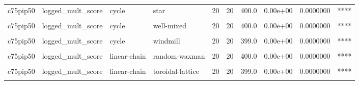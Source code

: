\documentclass[
]{book}
\begin{document}
\begin{table}
\begin{tabular}{l|l|l|l|r|r|r|r|r|l}
\hline
\cellcolor{gray!6}{c75pip50} & \cellcolor{gray!6}{logged\_mult\_score} & \cellcolor{gray!6}{cycle} & \cellcolor{gray!6}{random-waxman} & \cellcolor{gray!6}{20} & \cellcolor{gray!6}{20} & \cellcolor{gray!6}{400.0} & \cellcolor{gray!6}{0.00e+00} & \cellcolor{gray!6}{0.0000000} & \cellcolor{gray!6}{****}\\
\hline
c75pip50 & logged\_mult\_score & cycle & star & 20 & 20 & 400.0 & 0.00e+00 & 0.0000000 & ****\\
\hline
\cellcolor{gray!6}{c75pip50} & \cellcolor{gray!6}{logged\_mult\_score} & \cellcolor{gray!6}{cycle} & \cellcolor{gray!6}{toroidal-lattice} & \cellcolor{gray!6}{20} & \cellcolor{gray!6}{20} & \cellcolor{gray!6}{399.0} & \cellcolor{gray!6}{0.00e+00} & \cellcolor{gray!6}{0.0000000} & \cellcolor{gray!6}{****}\\
\hline
c75pip50 & logged\_mult\_score & cycle & well-mixed & 20 & 20 & 400.0 & 0.00e+00 & 0.0000000 & ****\\
\hline
\cellcolor{gray!6}{c75pip50} & \cellcolor{gray!6}{logged\_mult\_score} & \cellcolor{gray!6}{cycle} & \cellcolor{gray!6}{wheel} & \cellcolor{gray!6}{20} & \cellcolor{gray!6}{20} & \cellcolor{gray!6}{323.0} & \cellcolor{gray!6}{5.95e-04} & \cellcolor{gray!6}{0.0868700} & \cellcolor{gray!6}{ns}\\
\hline
c75pip50 & logged\_mult\_score & cycle & windmill & 20 & 20 & 399.0 & 0.00e+00 & 0.0000000 & ****\\
\hline
\cellcolor{gray!6}{c75pip50} & \cellcolor{gray!6}{logged\_mult\_score} & \cellcolor{gray!6}{linear-chain} & \cellcolor{gray!6}{random-barabasi-albert} & \cellcolor{gray!6}{20} & \cellcolor{gray!6}{20} & \cellcolor{gray!6}{400.0} & \cellcolor{gray!6}{0.00e+00} & \cellcolor{gray!6}{0.0000000} & \cellcolor{gray!6}{****}\\
\hline
c75pip50 & logged\_mult\_score & linear-chain & random-waxman & 20 & 20 & 400.0 & 0.00e+00 & 0.0000000 & ****\\
\hline
\cellcolor{gray!6}{c75pip50} & \cellcolor{gray!6}{logged\_mult\_score} & \cellcolor{gray!6}{linear-chain} & \cellcolor{gray!6}{star} & \cellcolor{gray!6}{20} & \cellcolor{gray!6}{20} & \cellcolor{gray!6}{400.0} & \cellcolor{gray!6}{0.00e+00} & \cellcolor{gray!6}{0.0000000} & \cellcolor{gray!6}{****}\\
\hline
c75pip50 & logged\_mult\_score & linear-chain & toroidal-lattice & 20 & 20 & 399.0 & 0.00e+00 & 0.0000000 & ****\\
\hline
\cellcolor{gray!6}{c75pip50} & \cellcolor{gray!6}{logged\_mult\_score} & \cellcolor{gray!6}{linear-chain} & \cellcolor{gray!6}{well-mixed} & \cellcolor{gray!6}{20} & \cellcolor{gray!6}{20} & \cellcolor{gray!6}{400.0} & \cellcolor{gray!6}{0.00e+00} & \cellcolor{gray!6}{0.0000000} & \cellcolor{gray!6}{****}\\

\end{tabular}
\end{table}
\end{document}
